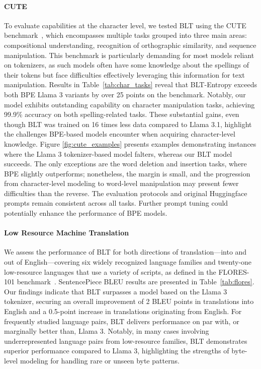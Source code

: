 \paragraph{CUTE}
To evaluate capabilities at the character level, we tested {\textsc BLT} using the CUTE benchmark~\citep{edman2024cute}, which encompasses multiple tasks grouped into three main areas: compositional understanding, recognition of orthographic similarity, and sequence manipulation. This benchmark is particularly demanding for most models reliant on tokenizers, as such models often have some knowledge about the spellings of their tokens but face difficulties effectively leveraging this information for text manipulation. Results in Table~\ref{tab:char_tasks} reveal that {\textsc BLT}-Entropy exceeds both BPE Llama 3 variants by over 25 points on the benchmark. Notably, our model exhibits outstanding capability on character manipulation tasks, achieving 99.9\% accuracy on both spelling-related tasks. These substantial gains, even though {\textsc BLT} was trained on 16 times less data compared to Llama 3.1, highlight the challenges BPE-based models encounter when acquiring character-level knowledge. Figure \ref{fig:cute_examples} presents examples demonstrating instances where the Llama 3 tokenizer-based model falters, whereas our {\textsc BLT} model succeeds. The only exceptions are the word deletion and insertion tasks, where BPE slightly outperforms; nonetheless, the margin is small, and the progression from character-level modeling to word-level manipulation may present fewer difficulties than the reverse. The evaluation protocols and original Huggingface prompts remain consistent across all tasks. Further prompt tuning could potentially enhance the performance of BPE models.

\paragraph{Low Resource Machine Translation} We assess the performance of {\textsc BLT} for both directions of translation—into and out of English—covering six widely recognized language families and twenty-one low-resource languages that use a variety of scripts, as defined in the FLORES-101 benchmark~\citep{goyal2022flores}. SentencePiece BLEU results are presented in Table~\ref{tab:flores}. Our findings indicate that {\textsc BLT} surpasses a model based on the Llama 3 tokenizer, securing an overall improvement of 2 BLEU points in translations into English and a 0.5-point increase in translations originating from English. For frequently studied language pairs, {\textsc BLT} delivers performance on par with, or marginally better than, Llama 3. Notably, in many cases involving underrepresented language pairs from low-resource families, {\textsc BLT} demonstrates superior performance compared to Llama 3, highlighting the strengths of byte-level modeling for handling rare or unseen byte patterns.

